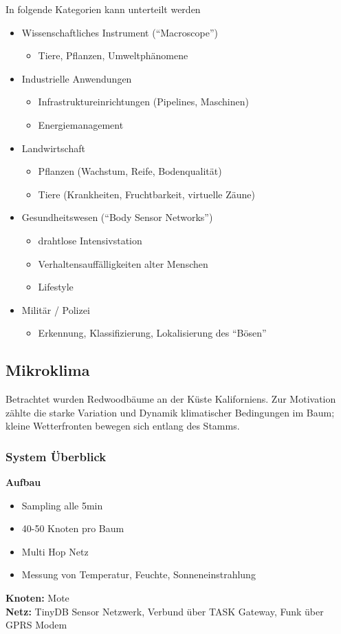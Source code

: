 \documentclass[a4paper]{article}
\begin{document}
\par In folgende Kategorien kann unterteilt werden
\begin{itemize}
	\item Wissenschaftliches Instrument (``Macroscope'')
	\begin{itemize}
		\item Tiere, Pflanzen, Umweltphänomene
	\end{itemize}
	
	\item Industrielle Anwendungen
	\begin{itemize}
		\item Infrastruktureinrichtungen (Pipelines, Maschinen)
		\item Energiemanagement
	\end{itemize}
	
	\item Landwirtschaft
	\begin{itemize}
		\item Pflanzen (Wachstum, Reife, Bodenqualität)
		\item Tiere (Krankheiten, Fruchtbarkeit, virtuelle Zäune)	
	\end{itemize}
	
	\item Gesundheitswesen (``Body Sensor Networks'')
	\begin{itemize}
		\item drahtlose Intensivstation
		\item Verhaltensauffälligkeiten alter Menschen
		\item Lifestyle	
	\end{itemize}
	
	\item Militär / Polizei
	\begin{itemize}
		\item Erkennung, Klassifizierung, Lokalisierung des ``Bösen''	
	\end{itemize}
\end{itemize}

\subsection{Mikroklima}
Betrachtet wurden Redwoodbäume an der Küste Kaliforniens. Zur Motivation zählte die starke Variation und Dynamik klimatischer Bedingungen im Baum; kleine Wetterfronten bewegen sich entlang des Stamms. 
\subsubsection{System Überblick}
\textbf{Aufbau}
\begin{itemize}
	\item Sampling alle 5min
	\item 40-50 Knoten pro Baum
	\item Multi Hop Netz
	\item Messung von Temperatur, Feuchte, Sonneneinstrahlung
\end{itemize}
\textbf{Knoten:} Mote\\
\textbf{Netz:} TinyDB Sensor Netzwerk, Verbund über TASK Gateway, Funk über GPRS Modem\\
\end{document}
